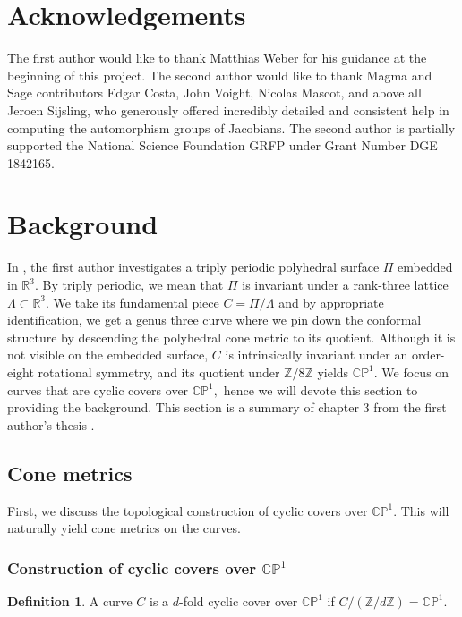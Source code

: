 \documentclass[12pt,reqno]{amsart}
\newcommand{\Z}{\mathbb{Z}}
\newcommand{\R}{\mathbb{R}}
\theoremstyle{definition}
\newtheorem{defn}{Definition}
\theoremstyle{remark}
\begin{document}
\section*{Acknowledgements} 
The first author would like to thank Matthias Weber for his guidance at the beginning of this project. The second author would like to thank Magma and Sage contributors Edgar Costa, John Voight, Nicolas Mascot, and above all Jeroen Sijsling, who generously offered incredibly detailed and consistent help in computing the automorphism groups of Jacobians. The second author is partially supported the National Science Foundation GRFP under Grant Number DGE 1842165. %

\section{Background}
\label{sec: dthesis}
In \cite{dami}, the first author investigates a triply periodic polyhedral surface $\Pi$ embedded in $\mathbb{R}^3.$ By triply periodic, we mean that $\Pi$ is invariant under a rank-three lattice $\Lambda \subset \R^3.$ We take its fundamental piece $C = \Pi / \Lambda$ and by appropriate identification, we get a genus three curve where we pin down the conformal structure by descending the polyhedral cone metric to its quotient. Although it is not visible on the embedded surface, $C$ is intrinsically invariant under an order-eight rotational symmetry, and its quotient under $\Z/ 8 \Z$ yields $\mathbb{C}\mathbb{P}^1.$ We focus on curves that are cyclic covers over $\mathbb{C}\mathbb{P}^1,$ hence we will devote this section to providing the background. This section is a summary of chapter 3 from the first author's thesis \cite{dthesis}. 

\subsection{Cone metrics}
First, we discuss the topological construction of cyclic covers over $\mathbb{C}\mathbb{P}^1.$ This will naturally yield cone metrics on the curves.

\subsubsection*{Construction of cyclic covers over $\mathbb{C}\mathbb{P}^1$}
\begin{defn} A curve $C$ is a $d$-fold cyclic cover over $\mathbb{C}\mathbb{P}^1$ if $C / (\Z/ d \Z) = \mathbb{C}\mathbb{P}^1.$ \end{defn}
\end{document}
